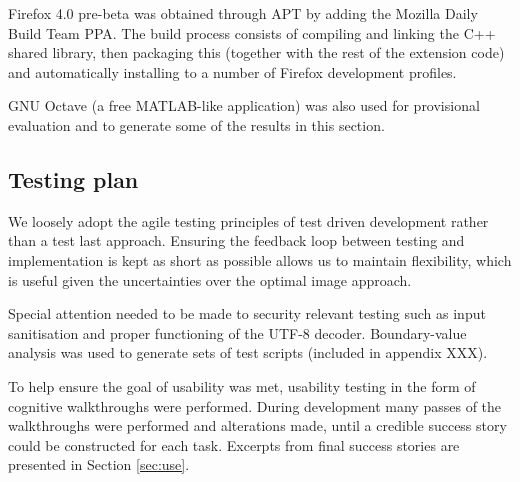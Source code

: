 Firefox 4.0 pre-beta was obtained through APT by adding the Mozilla Daily Build Team PPA. The build process consists of compiling and linking the C++ shared library, then packaging this (together with the rest of the extension code) and automatically installing to a number of Firefox development profiles.        

GNU Octave (a free MATLAB-like application) was also used for provisional evaluation and to generate some of the results in this section.


\subsection{Testing plan}

We loosely adopt the agile testing principles of test driven development rather than a test last approach. Ensuring the feedback loop between testing and implementation is kept as short as possible allows us to maintain flexibility, which is useful given the uncertainties over the optimal image approach.

Special attention needed to be made to security relevant testing such as input sanitisation and proper functioning of the UTF-8 decoder. Boundary-value analysis was used to generate sets of test scripts (included in appendix XXX).

To help ensure the goal of usability was met, usability testing in the form of cognitive walkthroughs were performed. During development many passes of the walkthroughs were performed and alterations made, until a credible success story could be constructed for each task. Excerpts from final success stories are presented in Section \ref{sec:use}.

